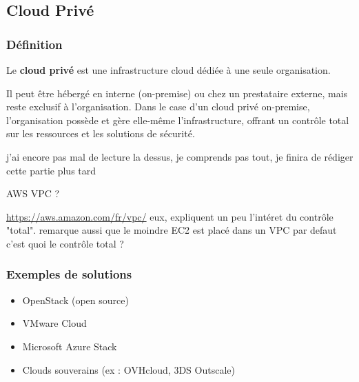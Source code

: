 \documentclass{report} %
\begin{document}



\subsection{Cloud Privé}

\subsubsection{Définition}
Le \textbf{cloud privé} est une infrastructure cloud dédiée à une
seule organisation.


Il peut être hébergé en interne (on-premise) ou
chez un prestataire externe, mais reste exclusif à l’organisation. 
Dans le case d’un cloud privé on-premise, l’organisation possède et gère elle-même l’infrastructure, offrant un contrôle total sur les ressources 
et les solutions de sécurité.

{\color{green} j'ai encore pas mal de lecture la dessus, je comprends pas tout, je finira de rédiger cette partie plus tard}


{\color{red} AWS VPC ?}

{\color{red} \url{https://aws.amazon.com/fr/vpc/} eux, expliquent un peu l'intéret du contrôle "total".
remarque aussi que le moindre EC2 est placé dans un VPC par defaut }
{\color{red} c'est quoi le contrôle total ?}

\subsubsection{Exemples de solutions}
\begin{itemize}
    \item OpenStack (open source)
    \item VMware Cloud
    \item Microsoft Azure Stack
    \item Clouds souverains (ex : OVHcloud, 3DS Outscale)
\end{itemize}
\end{document}
